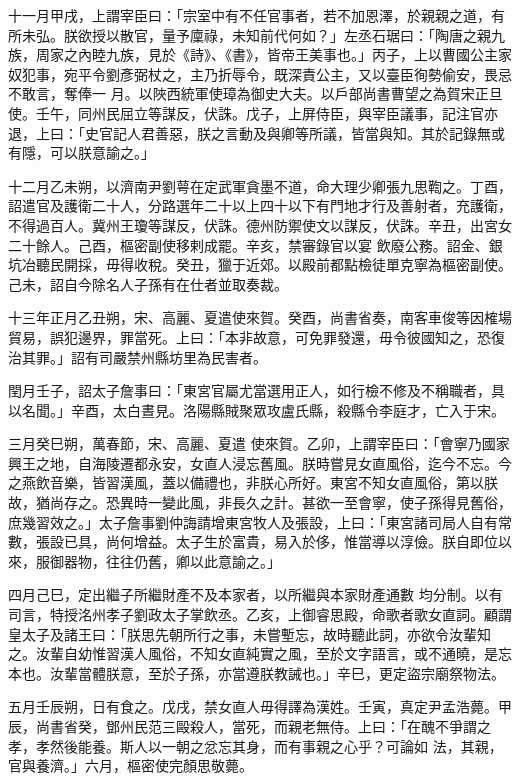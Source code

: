 \begin{pinyinscope}
 十一月甲戌，上謂宰臣曰：「宗室中有不任官事者，若不加恩澤，於親親之道，有所未弘。朕欲授以散官，量予廩祿，未知前代何如？」左丞石琚曰：「陶唐之親九族，周家之內睦九族，見於《詩》、《書》，皆帝王美事也。」丙子，上以曹國公主家奴犯事，宛平令劉彥弼杖之，主乃折辱令，既深責公主，又以臺臣徇勢偷安，畏忌不敢言，奪俸一
 月。以陜西統軍使璋為御史大夫。以戶部尚書曹望之為賀宋正旦使。壬午，同州民屈立等謀反，伏誅。戊子，上屏侍臣，與宰臣議事，記注官亦退，上曰：「史官記人君善惡，朕之言動及與卿等所議，皆當與知。其於記錄無或有隱，可以朕意諭之。」



 十二月乙未朔，以濟南尹劉萼在定武軍貪墨不道，命大理少卿張九思鞫之。丁酉，詔遣官及護衛二十人，分路選年二十以上四十以下有門地才行及善射者，充護衛，不得過百人。冀州王瓊等謀反，伏誅。德州防禦使文以謀反，伏誅。辛丑，出宮女二十餘人。己酉，樞密副使移剌成罷。辛亥，禁審錄官以宴
 飲廢公務。詔金、銀坑冶聽民開採，毋得收稅。癸丑，獵于近郊。以殿前都點檢徒單克寧為樞密副使。己未，詔自今除名人子孫有在仕者並取奏裁。



 十三年正月乙丑朔，宋、高麗、夏遣使來賀。癸酉，尚書省奏，南客車俊等因榷場貿易，誤犯邊界，罪當死。上曰：「本非故意，可免罪發還，毋令彼國知之，恐復治其罪。」詔有司嚴禁州縣坊里為民害者。



 閏月壬子，詔太子詹事曰：「東宮官屬尤當選用正人，如行檢不修及不稱職者，具以名聞。」辛酉，太白晝見。洛陽縣賊聚眾攻盧氏縣，殺縣令李庭才，亡入于宋。



 三月癸巳朔，萬春節，宋、高麗、夏遣
 使來賀。乙卯，上謂宰臣曰：「會寧乃國家興王之地，自海陵遷都永安，女直人浸忘舊風。朕時嘗見女直風俗，迄今不忘。今之燕飲音樂，皆習漢風，蓋以備禮也，非朕心所好。東宮不知女直風俗，第以朕故，猶尚存之。恐異時一變此風，非長久之計。甚欲一至會寧，使子孫得見舊俗，庶幾習效之。」太子詹事劉仲誨請增東宮牧人及張設，上曰：「東宮諸司局人自有常數，張設已具，尚何增益。太子生於富貴，易入於侈，惟當導以淳儉。朕自即位以來，服御器物，往往仍舊，卿以此意諭之。」



 四月己巳，定出繼子所繼財產不及本家者，以所繼與本家財產通數
 均分制。以有司言，特授洺州孝子劉政太子掌飲丞。乙亥，上御睿思殿，命歌者歌女直詞。顧謂皇太子及諸王曰：「朕思先朝所行之事，未嘗塹忘，故時聽此詞，亦欲令汝輩知之。汝輩自幼惟習漢人風俗，不知女直純實之風，至於文字語言，或不通曉，是忘本也。汝輩當體朕意，至於子孫，亦當遵朕教誡也。」辛巳，更定盜宗廟祭物法。



 五月壬辰朔，日有食之。戊戌，禁女直人毋得譯為漢姓。壬寅，真定尹孟浩薨。甲辰，尚書省癸，鄧州民范三毆殺人，當死，而親老無侍。上曰：「在醜不爭謂之孝，孝然後能養。斯人以一朝之忿忘其身，而有事親之心乎？可論如
 法，其親，官與養濟。」六月，樞密使完顏思敬薨。




\end{pinyinscope}
